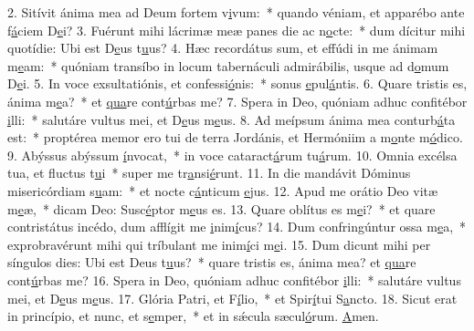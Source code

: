 2. Sitívit ánima mea ad Deum fortem v\uline{i}vum:~* quando véniam, et apparébo ante f\uline{á}ciem D\uline{e}i?
3. Fuérunt mihi lácrimæ meæ panes die ac n\uline{o}cte:~* dum dícitur mihi quotídie: Ubi est D\uline{e}us t\uline{u}us?
4. Hæc recordátus sum, et effúdi in me ánimam m\uline{e}am:~* quóniam transíbo in locum tabernáculi admirábilis, usque ad d\uline{o}mum D\uline{e}i.
5. In voce exsultatiónis, et confessi\uline{ó}nis:~* sonus \uline{e}pul\uline{á}ntis.
6. Quare tristis es, ánima m\uline{e}a?~* et \uline{qua}re cont\uline{ú}rbas me?
7. Spera in Deo, quóniam adhuc confitébor \uline{i}lli:~* salutáre vultus mei, et D\uline{e}us m\uline{e}us.
8. Ad meípsum ánima mea conturb\uline{á}ta est:~* proptérea memor ero tui de terra Jordánis, et Hermóniim a m\uline{o}nte m\uline{ó}dico.
9. Abýssus abýssum \uline{í}nvocat,~* in voce cataract\uline{á}rum tu\uline{á}rum.
10. Omnia excélsa tua, et fluctus t\uline{u}i~* super me tr\uline{a}nsi\uline{é}runt.
11. In die mandávit Dóminus misericórdiam s\uline{u}am:~* et nocte c\uline{á}nticum \uline{e}jus.
12. Apud me orátio Deo vitæ m\uline{e}æ,~* dicam Deo: Susc\uline{é}ptor m\uline{e}us es.
13. Quare oblítus es m\uline{e}i?~* et quare contristátus incédo, dum afflígit me \uline{i}nim\uline{í}cus?
14. Dum confringúntur ossa m\uline{e}a,~* exprobravérunt mihi qui tríbulant me inim\uline{í}ci m\uline{e}i.
15. Dum dicunt mihi per síngulos dies: Ubi est Deus t\uline{u}us?~* quare tristis es, ánima mea? et \uline{qua}re cont\uline{ú}rbas me?
16. Spera in Deo, quóniam adhuc confitébor \uline{i}lli:~* salutáre vultus mei, et D\uline{e}us m\uline{e}us.
17. Glória Patri, et F\uline{í}lio,~* et Spir\uline{í}tui S\uline{a}ncto.
18. Sicut erat in princípio, et nunc, et s\uline{e}mper,~* et in sǽcula sæcul\uline{ó}rum. \uline{A}men.
